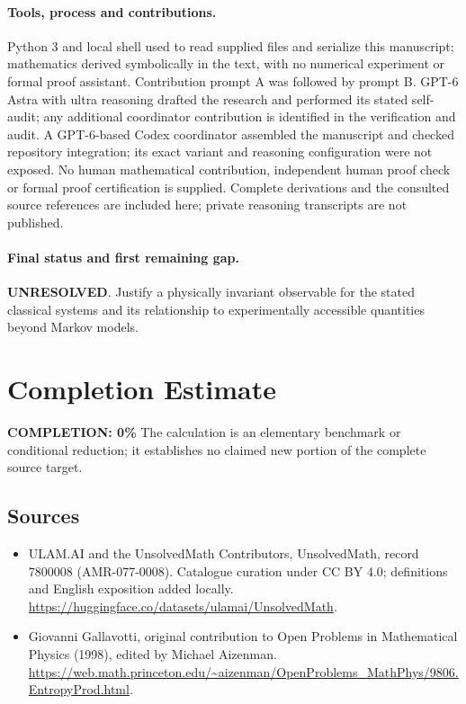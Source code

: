 \documentclass[11pt]{article}
\begin{document}
\paragraph{Tools, process and contributions.}
Python 3 and local shell used to read supplied files and serialize this manuscript; mathematics derived symbolically in the text, with no numerical experiment or formal proof assistant. Contribution prompt A was followed by prompt B. GPT-6 Astra with ultra reasoning drafted the research and performed its stated self-audit; any additional coordinator contribution is identified in the verification and audit. A GPT-6-based Codex coordinator assembled the manuscript and checked repository integration; its exact variant and reasoning configuration were not exposed. No human mathematical contribution, independent human proof check or formal proof certification is supplied. Complete derivations and the consulted source references are included here; private reasoning transcripts are not published.

\paragraph{Final status and first remaining gap.}
\textbf{UNRESOLVED}. Justify a physically invariant observable for the stated classical systems and its relationship to experimentally accessible quantities beyond Markov models.

\section{Completion Estimate}
\noindent\textbf{COMPLETION: 0\%}
The calculation is an elementary benchmark or conditional reduction; it establishes no claimed new portion of the complete source target.

\subsection{Sources}
\begin{itemize}
\item[\hypertarget{source:7800008:1}{S1}] ULAM.AI and the UnsolvedMath Contributors, UnsolvedMath, record 7800008 (AMR-077-0008). Catalogue curation under CC BY 4.0; definitions and English exposition added locally.
\url{https://huggingface.co/datasets/ulamai/UnsolvedMath}.
\item[\hypertarget{source:7800008:2}{S2}] Giovanni Gallavotti, original contribution to Open Problems in Mathematical Physics (1998), edited by Michael Aizenman.
\url{https://web.math.princeton.edu/~aizenman/OpenProblems_MathPhys/9806.EntropyProd.html}.
\end{itemize}
\label{end:7800008}
\end{document}
